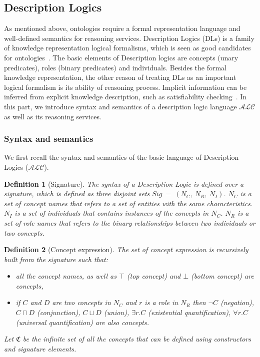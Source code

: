 \documentclass{article}
\newtheorem{mydef}{Definition}
\begin{document}
\subsection{Description Logics}
As mentioned above, ontologies require a formal representation language and well-defined semantics for reasoning services. 
Description Logics (DLs) is a family of knowledge representation logical formalisms, which is seen as good candidates for ontologies~\cite{horrocks1999description}.
The basic elements of Description logics are concepts (unary predicates), roles (binary predicates) and individuals.
Besides the formal knowledge representation, the other reason of treating DLs as an important logical formalism is its ability of reasoning process.
Implicit information can be inferred from explicit knowledge description, such as satisfiability checking~\cite{baader2003description}. 
In this part, we introduce syntax and semantics of a description logic language $\mathcal{ALC}$ as well as its reasoning services.
\subsubsection{Syntax and semantics}
We first recall the syntax and semantics of the basic language of Description Logics ($\mathcal{ALC}$).
\begin{mydef}[Signature]
 The syntax of a Description Logic is defined over a signature, which is defined as three disjoint sets $Sig~=~(N_C,~N_R,~N_I)$. $N_C$ is a set of concept names that refers to a set of entities
 with the same characteristics. $N_I$ is a set of individuals that contains instances of the concepts in $N_C$.  $N_R$ is a set of role names that refers to the binary relationships between 
 two individuals or two concepts.
\end{mydef}


\begin{mydef}[Concept expression]
 The set of concept expression is recursively built from the signature such that:
 \begin{itemize}
  \item all the concept names, as well as $\top$ (top concept) and $\bot$ (bottom concept) are concepts,
  \item if $C$ and $D$ are two concepts in $N_C$ and $r$ is a role in $N_R$
  then $\neg C$ (negation), $ C\sqcap D$ (conjunction), $ C\sqcup D$ (union), $ \exists r.C$ (existential quantification), $\forall r.C$ (universal quantification) are also concepts.
 \end{itemize}
 Let $\mathfrak{C}$ be the infinite set of all the concepts that can be defined using constructors and signature elements.
\end{mydef}
\end{document}
